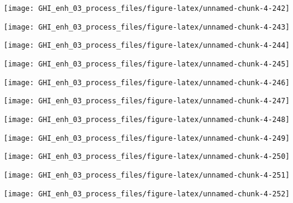 \documentclass[
  10pt,
  a4paper,oneside]{article}
\begin{document}
\begin{center}\texttt{[image: GHI\_enh\_03\_process\_files/figure-latex/unnamed-chunk-4-242]} \end{center}

\begin{center}\texttt{[image: GHI\_enh\_03\_process\_files/figure-latex/unnamed-chunk-4-243]} \end{center}

\begin{center}\texttt{[image: GHI\_enh\_03\_process\_files/figure-latex/unnamed-chunk-4-244]} \end{center}

\begin{center}\texttt{[image: GHI\_enh\_03\_process\_files/figure-latex/unnamed-chunk-4-245]} \end{center}

\begin{center}\texttt{[image: GHI\_enh\_03\_process\_files/figure-latex/unnamed-chunk-4-246]} \end{center}

\begin{center}\texttt{[image: GHI\_enh\_03\_process\_files/figure-latex/unnamed-chunk-4-247]} \end{center}

\begin{center}\texttt{[image: GHI\_enh\_03\_process\_files/figure-latex/unnamed-chunk-4-248]} \end{center}

\begin{center}\texttt{[image: GHI\_enh\_03\_process\_files/figure-latex/unnamed-chunk-4-249]} \end{center}

\begin{center}\texttt{[image: GHI\_enh\_03\_process\_files/figure-latex/unnamed-chunk-4-250]} \end{center}

\begin{center}\texttt{[image: GHI\_enh\_03\_process\_files/figure-latex/unnamed-chunk-4-251]} \end{center}

\begin{center}\texttt{[image: GHI\_enh\_03\_process\_files/figure-latex/unnamed-chunk-4-252]} \end{center}
\end{document}
